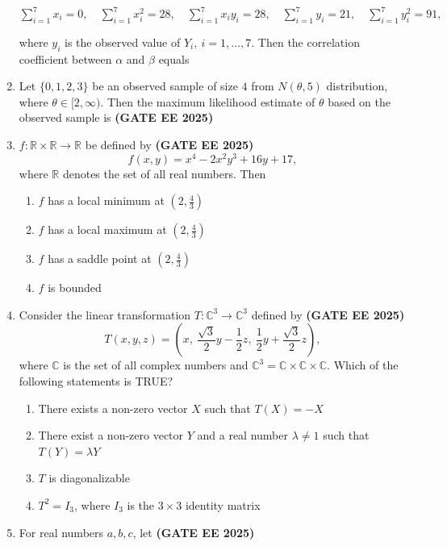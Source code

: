 \documentclass[journal,12pt,onecolumn]{IEEEtran}
\theoremstyle{remark}
\begin{document}
\begin{enumerate}
$\sum_{i=1}^7 x_i = 0, \quad \sum_{i=1}^7 x_i^2 = 28, \quad \sum_{i=1}^7 x_i y_i = 28, \quad \sum_{i=1}^7 y_i = 21, \quad \sum_{i=1}^7 y_i^2 = 91,$

where $y_i$ is the observed value of $Y_i, \ i=1,\ldots,7$. Then the correlation coefficient between $\alpha$ and $\beta$ equals \underline{\hspace{2cm}}

\item Let $\{0,1,2,3\}$ be an observed sample of size $4$ from $N(\theta,5)$ distribution, where $\theta \in [2,\infty)$. Then the maximum likelihood estimate of $\theta$ based on the observed sample is \underline{\hspace{2cm}} \hfill \textbf{(GATE EE 2025)}


\item  $f:\mathbb{R}\times \mathbb{R} \to \mathbb{R}$ be defined by \hfill \textbf{(GATE EE 2025)}
\[
f(x,y) = x^4 - 2x^2y^3 + 16y + 17,
\]
where $\mathbb{R}$ denotes the set of all real numbers. Then 
\begin{enumerate}
    \item $f$ has a local minimum at $(2,\tfrac{4}{3})$
    \item $f$ has a local maximum at $(2,\tfrac{4}{3})$
    \item $f$ has a saddle point at $(2,\tfrac{4}{3})$
    \item $f$ is bounded
\end{enumerate}

\item Consider the linear transformation $T: \mathbb{C}^3 \to \mathbb{C}^3$ defined by \hfill \textbf{(GATE EE 2025)}
\[
T(x,y,z) = \left(x, \ \frac{\sqrt{3}}{2}y - \frac{1}{2}z, \ \frac{1}{2}y + \frac{\sqrt{3}}{2}z\right),
\]
where $\mathbb{C}$ is the set of all complex numbers and $\mathbb{C}^3 = \mathbb{C}\times \mathbb{C}\times \mathbb{C}$. Which of the following statements is TRUE?
\begin{enumerate}
    \item There exists a non-zero vector $X$ such that $T(X) = -X$
    \item There exist a non-zero vector $Y$ and a real number $\lambda \neq 1$ such that $T(Y) = \lambda Y$
    \item $T$ is diagonalizable
    \item $T^2 = I_3$, where $I_3$ is the $3 \times 3$ identity matrix
\end{enumerate}

\item For real numbers $a, b, c$, let \hfill \textbf{(GATE EE 2025)}


\end{enumerate}
\end{document}
